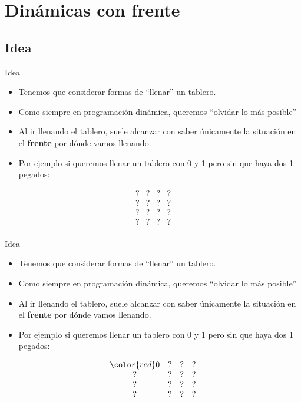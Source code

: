 \documentclass{beamer}
\begin{document}
\section{Dinámicas con frente}

\subsection{Idea}

\begin{frame}{Idea}
    \begin{itemize}
		\item Tenemos que considerar formas de ``llenar'' un tablero.
		\item Como siempre en programación dinámica, queremos ``olvidar lo más posible''
		\item Al ir llenando el tablero, suele alcanzar con saber únicamente la situación en el \textbf{frente} por dónde vamos llenando.
		\item Por ejemplo si queremos llenar un tablero con 0 y 1 pero sin que haya dos 1 pegados:
    \end{itemize}
    $$\begin{array}{cccc}
		? & ? & ? & ? \\
		? & ? & ? & ? \\
		? & ? & ? & ? \\
		? & ? & ? & ? \\
    \end{array}$$
\end{frame}

\begin{frame}{Idea}
    \begin{itemize}
		\item Tenemos que considerar formas de ``llenar'' un tablero.
		\item Como siempre en programación dinámica, queremos ``olvidar lo más posible''
		\item Al ir llenando el tablero, suele alcanzar con saber únicamente la situación en el \textbf{frente} por dónde vamos llenando.
		\item Por ejemplo si queremos llenar un tablero con 0 y 1 pero sin que haya dos 1 pegados:
    \end{itemize}
    $$\begin{array}{cccc}
		\color{red}0 & ? & ? & ? \\
		? & ? & ? & ? \\
		? & ? & ? & ? \\
		? & ? & ? & ? \\
    \end{array}$$
\end{frame}
\end{document}
